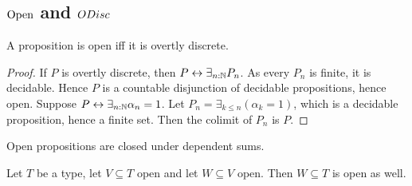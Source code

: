
\subsection{$\mathrm{Open}$ and $\ODisc$} %
\begin{lemma}\label{PropOpenIffOdisc}
  A proposition is open iff it is overtly discrete.
\end{lemma}
\begin{proof}
  If $P$ is overtly discrete, then $P\leftrightarrow \exists_{n:\mathbb{N}} P_n$. 
  As every $P_n$ is finite, it is decidable. 
  Hence $P$ is a countable disjunction of decidable propositions, hence open.
  Suppose $P\leftrightarrow \exists_{n:\mathbb{N}} \alpha_n = 1$. 
  Let $P_n = \exists_{k\leq n} (\alpha_k = 1)$, which is a decidable proposition, hence a finite set. 
  Then the colimit of $P_n$ is $P$. 
\end{proof}
\begin{corollary}\label{OpenDependentSums}
  Open propositions are closed under dependent sums. 
\end{corollary}
\begin{corollary}\label{OpenTransitive}
  Let $T$ be a type, let $V\subseteq T$ open and let $W\subseteq V$ open. 
  Then $W\subseteq T$ is open as well. 
\end{corollary}

